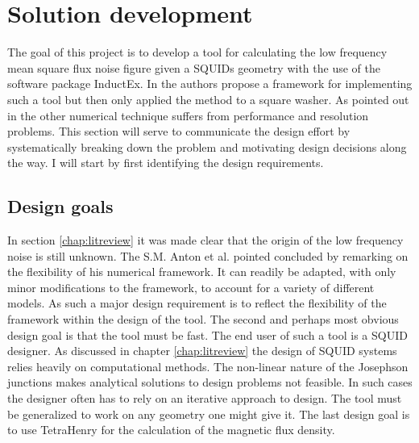 \graphicspath{{solutiondevelopment/fig/}}

\chapter{Solution development}
\label{chap:solutiondevelopment}
The goal of this project is to develop a tool for calculating the low frequency mean square flux noise figure given a SQUIDs geometry with the use of the software package InductEx. In \cite{fluxNoiseSquidsStevenAnton} the authors propose a framework for implementing such a tool but then only applied the method to a square washer. As pointed out in \cite{fluxNoiseSquidsStevenAnton} the other numerical technique suffers from performance and resolution problems. This section will serve to communicate the design effort by systematically breaking down the problem and motivating design decisions along the way. I will start by first identifying the design requirements.

\section{Design goals}
\label{chap:dgoals}
In section \ref{chap:litreview} it was made clear that the origin of the low frequency noise is still unknown. The S.M. Anton et al. pointed concluded \cite{fluxNoiseSquidsStevenAnton} by remarking on the flexibility of his numerical framework. It can readily be adapted, with only minor modifications to the framework, to account for a variety of different models. As such a major design requirement is to reflect the flexibility of the framework within the design of the tool.
The second and perhaps most obvious design goal is that the tool must be fast. The end user of such a tool is a SQUID designer. As discussed in chapter \ref{chap:litreview} the design of SQUID systems relies heavily on computational methods. The non-linear nature of the Josephson junctions makes analytical solutions to design problems not feasible. In such cases the designer often has to rely on an iterative approach to design.
The tool must be generalized to work on any geometry one might give it.
The last design goal is to use TetraHenry for the calculation of the magnetic flux density. 

